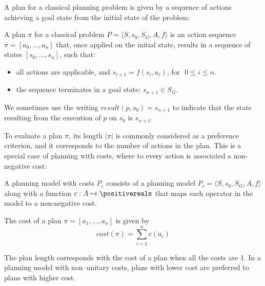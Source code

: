 A plan for a classical planning problem is given by a sequence of
actions achieving a goal state from the initial state of the problem:

\begin{definition}
 A plan $\pi$ for a classical problem  $P = \langle S, s_0, S_G, A, f \rangle$
 is an action sequence $\pi = \left[ a_0, \ldots, a_n \right]$
 that, once applied on the initial state,
 results in a sequence of states $[ s_0, \ldots, s_n ]$, such that:
\begin{itemize}
  \item all actions are applicable, and $s_{i+1} = f (s_i, a_i)$, 
   \mbox{for $\,0 \le i \le n$.}
  \item the sequence terminates in a goal state: $s_{n+1} \in S_G$.
\end{itemize}

    We sometimes use the writing $result(p, s_0) = s_{n+1}$ to indicate that the state resulting from the execution of $p$
    on $s_0$ is $s_{n+1}$.
\end{definition}

To evaluate a plan $\pi$, its length $|\pi|$ is commonly considered as
a preference criterion, and it corresponds to the number of actions in
the plan. This is a special case of planning with costs, where to
every action is associated a non-negative cost:

\begin{definition}\label{def:planning-cost}
  A planning model with costs $P_c$ consists of a planning model
   $P_c = \langle S, s_0, S_G, A, f \rangle$ along with a function \linebreak
  \hbox{$c: A \mapsto \positivereals$} that maps each operator in the model
  to a non-negative cost.
\end{definition}

\begin{definition}
  The cost of a plan $\pi = [ a_1, \ldots, a_n ]$ is given by
  \begin{equation*}
    \mathit{cost}(\pi) = \sum_{i = 1}^n c(a_i)
  \end{equation*}
  \label{def:plan-cost}
\end{definition}

The plan length corresponds with the cost of a plan when 
all the costs are 1. In a planning model with non--unitary costs,
 plans with lower cost are preferred
to plans with higher cost. 



